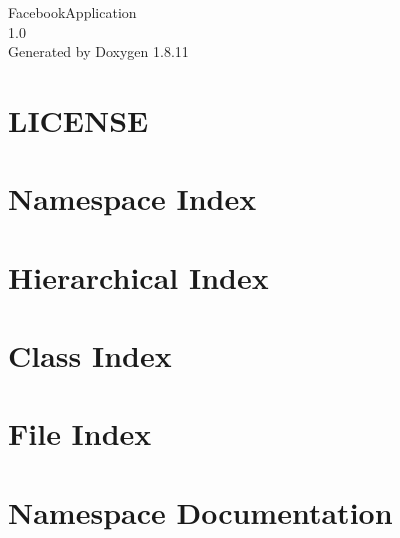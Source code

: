 \documentclass[twoside]{book}
\newcommand{\+}{\discretionary{\mbox{\scriptsize$\hookleftarrow$}}{}{}}
\newcommand{\clearemptydoublepage}{%
  \newpage{\pagestyle{empty}\cleardoublepage}%
}
\begin{document}
\hypersetup{pageanchor=false,
             bookmarksnumbered=true,
             pdfencoding=unicode
            }
\begin{titlepage}
\vspace*{7cm}
\begin{center}%
{\Large Facebook\+Application \\[1ex]\large 1.\+0 }\\
\vspace*{1cm}
{\large Generated by Doxygen 1.8.11}\\
\end{center}
\end{titlepage}
\clearemptydoublepage
\tableofcontents
\clearemptydoublepage
{}
\hypersetup{pageanchor=true}

\chapter{L\+I\+C\+E\+N\+SE}
\label{md_FacebookApplication_packages_Newtonsoft.Json.10.0.3_LICENSE}
\hypertarget{md_FacebookApplication_packages_Newtonsoft.Json.10.0.3_LICENSE}{}

\chapter{Namespace Index}

\chapter{Hierarchical Index}

\chapter{Class Index}

\chapter{File Index}

\chapter{Namespace Documentation}












\end{document}
